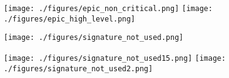 \documentclass[landscape, a4paper]{article}
\begin{document}
\begin{minipage}[t]{0.2\linewidth}
\begin{betterlist}
\begin{betterlist}
			\texttt{[image: ./figures/epic\_non\_critical.png]}
			\texttt{[image: ./figures/epic\_high\_level.png]}

			\begin{minipage}[b]{0.5\linewidth}

				\texttt{[image: ./figures/signature\_not\_used.png]}
			\end{minipage}
			\begin{minipage}[b]{0.5\linewidth}

				\texttt{[image: ./figures/signature\_not\_used15.png]}
				\texttt{[image: ./figures/signature\_not\_used2.png]}
			\end{minipage}


\end{betterlist}
\end{betterlist}
\end{minipage}
\end{document}
